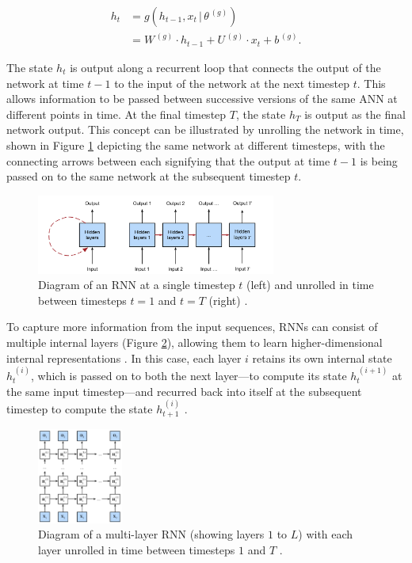 \documentclass[a4paper, 11pt]{report}
\begin{document}
    \begin{align}
        \label{eq: rnn-state}
        h_t &= g( h_{t-1}, x_t \, \vert \, \theta^{\,(g)} ) \\
        &= W^{\,(g)} \cdot h_{t-1} + U^{\,(g)} \cdot x_t + b^{\,(g)}
        \text{.}
    \end{align}

    The state $h_t$ is output along a recurrent loop that connects the output of the network at time $t-1$ to the input of the network at the next timestep $t$. This allows information to be passed between successive versions of the same ANN at different points in time. At the final timestep $T$, the state $h_T$ is output as the final network output. This concept can be illustrated by unrolling the network in time, shown in Figure \ref{fig: rnn-diagram} depicting the same network at different timesteps, with the connecting arrows between each signifying that the output at time $t-1$ is being passed on to the same network at the subsequent timestep $t$.

    \begin{figure}[ht]
        \centering
        \includegraphics[width=0.7\textwidth]{rnn.png}
        \caption{\centering Diagram of an RNN at a single timestep $t$ (left) and unrolled in time between timesteps $t=1$ and $t=T$ (right) \citep{zhang-2021}.}
        \label{fig: rnn-diagram}
    \end{figure}

    To capture more information from the input sequences, RNNs can consist of multiple internal layers (Figure \ref{fig: deep-rnn}), allowing them to learn higher-dimensional internal representations \citep{bengio-2009}. In this case, each layer $i$ retains its own internal state $h^{\,(i)}_t$, which is passed on to both the next layer---to compute its state $h^{\,(i+1)}_t$ at the same input timestep---and recurred back into itself at the subsequent timestep to compute the state $h^{\,(i)}_{t+1}$ \citep{zhang-2021}. 

    \begin{figure}[ht]
        \centering
        \includegraphics[width=0.25\textwidth]{deep-rnn.png}
        \caption{\centering Diagram of a multi-layer RNN (showing layers $1$ to $L$) with each layer unrolled in time between timesteps $1$ and $T$ \citep{zhang-2021}.}
        \label{fig: deep-rnn}
    \end{figure}
\end{document}
